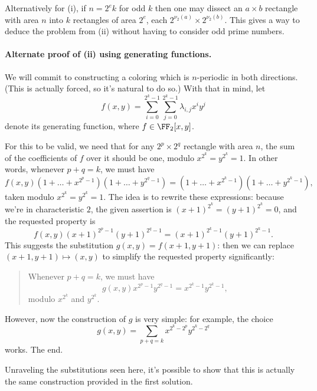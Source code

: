 \begin{remark*}
  Alternatively for (i), if $n = 2^e k$ for odd $k$ then one may dissect
  an $a \times b$ rectangle with area $n$ into
  $k$ rectangles of area $2^e$, each $2^{\nu_2(a)} \times 2^{\nu_2(b)}$.
  This gives a way to deduce the problem from (ii)
  without having to consider odd prime numbers.
\end{remark*}

\paragraph{Alternate proof of (ii) using generating functions.}
We will commit to constructing a coloring which is $n$-periodic in both directions.
(This is actually forced, so it's natural to do so.)
With that in mind, let
\[ f(x, y) = \sum_{i=0}^{2^k-1} \sum_{j=0}^{2^k-1} \lambda_{i, j} x^i y^j \]
denote its generating function, where $f \in \FF_2[x, y]$.

For this to be valid, we need that for any $2^p \times 2^q$ rectangle with area $n$,
the sum of the coefficients of $f$ over it should be one, modulo $x^{2^k} = y^{2^k} = 1$.
In other words, whenever $p+q = k$, we must have
\[
  f(x, y) (1 + \dots + x^{2^p-1}) (1 + \dots + y^{2^q-1})
  = (1 + \dots + x^{2^k-1})(1 + \dots + y^{2^k-1}),
\]
taken modulo $x^{2^k} = y^{2^k} = 1$.
The idea is to rewrite these expressions:
because we're in characteristic $2$, the given assertion is $(x+1)^{2^k} = (y+1)^{2^k} = 0$,
and the requested property is
\[ f(x, y) (x+1)^{2^p-1} (y+1)^{2^q-1} = (x+1)^{2^k-1} (y+1)^{2^k-1}. \]
This suggests the substitution $g(x, y) = f(x+1, y+1)$:
then we can replace $(x+1, y+1) \mapsto (x, y)$ to simplify the requested property significantly:
\begin{quote}
  Whenever $p+q = k$, we must have
  \[ g(x, y) x^{2^p-1} y^{2^q-1} = x^{2^k-1} y^{2^k-1}, \]
  modulo $x^{2^k}$ and $y^{2^k}$.
\end{quote}
However, now the construction of $g$ is very simple: for example, the choice
\[ g(x, y) = \sum_{p+q=k} x^{2^k-2^p} y^{2^k-2^q} \]
works. The end.

\begin{remark*}
  Unraveling the substitutions seen here,
  it's possible to show that this is actually the
  same construction provided in the first solution.
\end{remark*}
